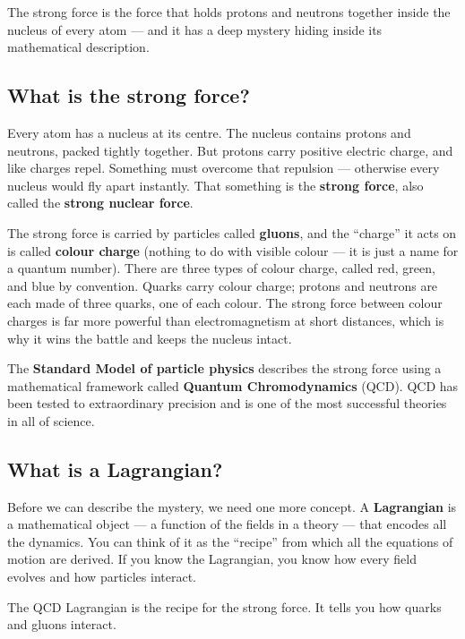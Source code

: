 \documentclass[11pt,a4paper]{article}
\newcommand{\term}[1]{\textbf{#1}}
\begin{document}
\begin{tcolorbox}[colback=boxblue,colframe=blue!40!black,title=In one sentence]
The strong force is the force that holds protons and neutrons together inside the nucleus of every atom --- and it has a deep mystery hiding inside its mathematical description.
\end{tcolorbox}

\subsection{What is the strong force?}

Every atom has a nucleus at its centre.  The nucleus contains protons and neutrons, packed tightly together.  But protons carry positive electric charge, and like charges repel.  Something must overcome that repulsion --- otherwise every nucleus would fly apart instantly.  That something is the \term{strong force}, also called the \term{strong nuclear force}.

The strong force is carried by particles called \term{gluons}, and the ``charge'' it acts on is called \term{colour charge} (nothing to do with visible colour --- it is just a name for a quantum number).  There are three types of colour charge, called red, green, and blue by convention.  Quarks carry colour charge; protons and neutrons are each made of three quarks, one of each colour.  The strong force between colour charges is far more powerful than electromagnetism at short distances, which is why it wins the battle and keeps the nucleus intact.

The \term{Standard Model of particle physics} describes the strong force using a mathematical framework called \term{Quantum Chromodynamics} (QCD).  QCD has been tested to extraordinary precision and is one of the most successful theories in all of science.

\subsection{What is a Lagrangian?}

Before we can describe the mystery, we need one more concept.  A \term{Lagrangian} is a mathematical object --- a function of the fields in a theory --- that encodes all the dynamics.  You can think of it as the ``recipe'' from which all the equations of motion are derived.  If you know the Lagrangian, you know how every field evolves and how particles interact.

The QCD Lagrangian is the recipe for the strong force.  It tells you how quarks and gluons interact.
\end{document}

